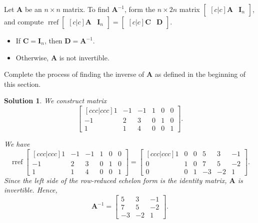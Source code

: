 \documentclass[]{book}
\DeclareMathOperator{\rref}{rref}
\newcommand{\inv}[1]{\ensuremath{{#1}^{-1}}}
\newcommand{\invm}[1]{\ensuremath{\inv{\mat{#1}}}}
\newcommand{\mat}[1]{\ensuremath{\mathbf{#1}}}
\newcommand{\idmat}[1][n]{\ensuremath{\mat{I}_#1}}
\newtheorem*{solution}{Solution}
\begin{document}
\begin{theorem}
    \label{thm: algorithm for finding inverse}
    Let $\mat{A}$ be an $n \times n$ matrix. To find $\invm{A}$, form the $n \times 2n$ matrix $\begin{bmatrix}[c|c]\mat{A} & \idmat[n]\end{bmatrix}$, and compute $\rref \begin{bmatrix}[c|c]\mat{A} & \idmat[n]\end{bmatrix} = \begin{bmatrix}[c|c]\mat{C} & \mat{D}\end{bmatrix}$. 
    \begin{itemize}
        \item If $\mat{C} = \idmat[n]$, then $\mat{D} = \invm{A}$.
        \item Otherwise, $\mat{A}$ is not invertible.
    \end{itemize}
\end{theorem}

\begin{example}
    \label{expl: finding inverse}
    Complete the process of finding the inverse of $\mat{A}$ as defined in the beginning of this section.
\begin{solution}
    We construct matrix 
    \[\begin{bmatrix}[ccc|ccc]1 & -1 & -1 & 1 & 0 & 0 \\ -1 & 2 & 3 & 0 & 1 & 0 \\ 1 & 1 & 4 & 0 & 0 & 1\end{bmatrix}.\]
    
    We have
    \[\rref \begin{bmatrix}[ccc|ccc]1 & -1 & -1 & 1 & 0 & 0 \\ -1 & 2 & 3 & 0 & 1 & 0 \\ 1 & 1 & 4 & 0 & 0 & 1\end{bmatrix} = \begin{bmatrix}[ccc|ccc] 1 & 0 & 0 & 5 & 3 & -1 \\ 0 & 1 & 0 & 7 & 5 & -2 \\ 0 & 0 & 1 & -3 & -2 & 1\end{bmatrix}.\]
    Since the left side of the row-reduced echelon form is the identity matrix, $\mat{A}$ is invertible. Hence, \[\invm{A}=\begin{bmatrix}5 & 3 & -1 \\ 7 & 5 & -2 \\ -3 & -2 & 1\end{bmatrix}.\] \hfill \qedsymbol
\end{solution}
\end{example}
\end{document}
